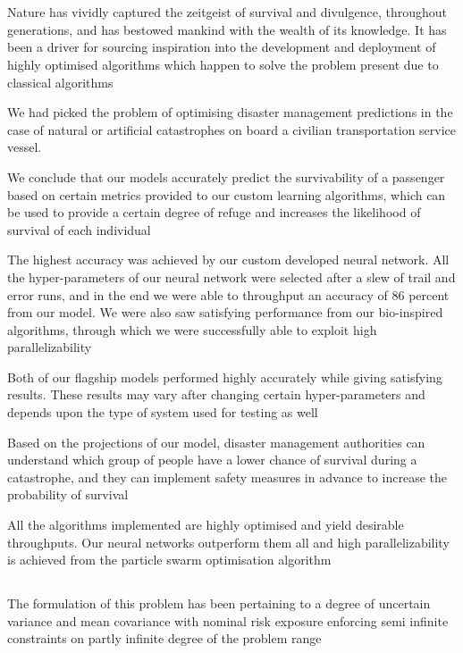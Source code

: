 \documentclass[12pt]{article}
\newcommand{\nd}{\noindent}
\newcommand{\secsize}{\fontsize{15pt}{12pt}\selectfont}
\newcommand{\subsize}{\fontsize{14pt}{12pt}\selectfont}
\begin{document}
\newpage
\section{\textbf{\secsize{CONCLUSION}}}
Nature has vividly captured the zeitgeist of survival and divulgence, throughout generations, and has bestowed mankind with the wealth of its knowledge. It has been a driver for sourcing inspiration into the development and deployment of highly optimised algorithms which happen to solve the problem present due to classical algorithms

\nd We had picked the problem of optimising disaster management predictions in the case of natural or artificial catastrophes on board a civilian transportation service vessel. 

\nd We conclude that our models accurately predict the survivability of a passenger based on certain metrics provided to our custom learning algorithms, which can be used to provide a certain degree of refuge and increases the likelihood of survival of each individual 

\nd The highest accuracy was achieved by our custom developed neural network. All the hyper-parameters of our neural network were selected after a slew of trail and error runs, and in the end we were able to throughput an accuracy of 86 percent from our model. We were also saw satisfying performance from our bio-inspired algorithms, through which we were successfully able to exploit high parallelizability

\nd Both of our flagship models performed highly accurately while giving satisfying results. These results may vary after changing certain hyper-parameters and depends upon the type of system used for testing as well 

\nd Based on the projections of our model, disaster management authorities can understand which group of people have a lower chance of survival during a catastrophe, and they can implement safety measures in advance to increase the probability of survival 

\nd All the algorithms implemented are highly optimised and yield desirable throughputs. Our neural networks outperform them all and high parallelizability is achieved from the particle swarm optimisation algorithm 

\newpage
\subsection{\textbf{\subsize{FUTURE SCOPE}}}
The formulation of this problem has been pertaining to a degree of uncertain variance and mean covariance with nominal risk exposure enforcing semi infinite constraints on partly infinite degree of the problem range 
\end{document}
